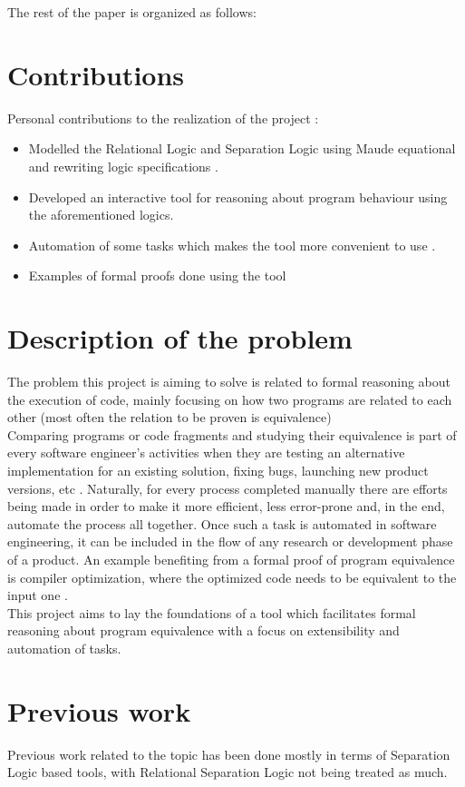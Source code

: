 \documentclass[12pt,a4paper]{article}
\begin{document}
The rest of the paper is organized as follows: 


\section{Contributions}
Personal contributions to the realization of the project : 
\begin{itemize}
	\item Modelled the Relational Logic and Separation Logic using Maude equational and rewriting logic specifications . 
	\item Developed an interactive tool for reasoning about program behaviour using the aforementioned logics.
	\item Automation of some tasks which makes the tool more convenient to use .
	\item Examples of formal proofs done using the tool
\end{itemize}
\section{Description of the problem}
The problem this project is aiming to solve is related to formal reasoning about the execution of code, mainly focusing on how two programs are related to each other (most often the relation to be proven is equivalence)\\

Comparing programs or code fragments and studying their equivalence is part of every software engineer's activities when they are testing an alternative implementation for an existing solution, fixing bugs, launching new product versions, etc . Naturally, for every process completed manually there are efforts being made in order to make it more efficient, less error-prone and, in the end, automate the process all together. Once such a task is automated in software engineering, it can be included in the flow of any research or development phase of a product. An example benefiting from a formal proof of program equivalence is compiler optimization, where the optimized code needs to be equivalent to the input one . \\

This project aims to lay the foundations of a tool which facilitates formal reasoning about program equivalence with a focus on extensibility and automation of tasks.

\section{Previous work}
Previous work related to the topic has been done mostly in terms of Separation Logic based tools, with Relational Separation Logic not being treated as much. \\
\end{document}
